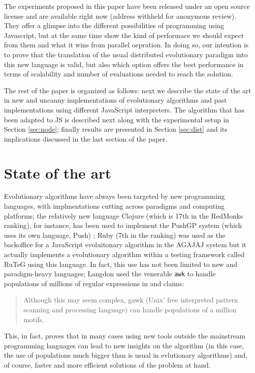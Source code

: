 \documentclass{sig-alternate}
\begin{document}
The experiments proposed in this paper have been released under an
open source license and are available right now (address withheld for
anonymous review). They offer a glimpse into the different
possibilities of programming using Javascript, but at the same time
show the kind of performace we should expect from them and what it
wins from parallel oepration. In doing so, our intention is to prove
that the translation of the usual distributed evolutionary paradigm
into this new language is valid, but also which option offers the best
performance in terms of scalability and number of evaluations needed
to reach the solution.

The rest of the paper is organized as follows: next we describe the
state of the art in new and uncanny implementations of evolutionary algorithms and
past implementations using different JavaScript interpreters. The
algorithm that has been adapted to JS is described next along with the
experimental setup in Section \ref{sec:node}; finally results are
presented in Section \ref{sec:dist} and its implications
discussed in the last section of the paper. 

\section{State of the art}
\label{sec:soa}

Evolutionary algorithms have always been targeted by new programming
languages, with implmentations cutting across paradigms and computing
platforms; the relatively new language Clojure (which is 17th in the
RedMonks ranking), for instance, has been used to implement the PushGP
system (which uses its own language, Push) \cite{helmuth2013evolving};
Ruby (7th in the ranking) was used as the backoffice for a JavaScript
evoluitonary algorithm in the AGAJAJ system \cite{agajaj} but it
actually implements a evolutionary algorithm within a testing
framework called RuTeG \cite{mairhofer2011search} using this
language. In fact, this use has not been limited to new and
paradigm-heavy languages; Langdon used the venerable {\tt awk} to
handle populations of millions of regular expressions in
\cite{langdon2008evolving,langdon2009evolving} and claims:
\begin{quote}
Although this may seem complex, gawk (Unix' free interpreted pattern
scanning and processing language) can handle populations of a million
motifs. 
\end{quote}
This, in fact, proves that in many cases using new tools outside the
mainstream programming languages can lead to new insights on the
algorithm (in this case, the use of populations much bigger than is
usual in evlutionary algorithms) and, of course, faster and more
efficient solutions of the problem at hand. 
\end{document}
